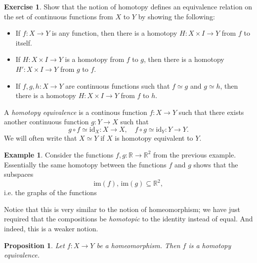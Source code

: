 \documentclass[10pt]{amsart}
\newtheorem{proposition}[thm]{Proposition}
\theoremstyle{definition}
\newtheorem{ex}[thm]{Example}
\newtheorem{exercise}[thm]{Exercise}
\newcommand{\cdef}[1]{\textcolor{Bittersweet}{#1}}
\begin{document}
\begin{exercise}
    Show that the notion of homotopy defines an equivalence relation on the set of continuous functions from $X$ to $Y$ by showing the following:
    \begin{itemize}
        \item If $f:X \to Y$ is any function, then there is a homotopy $H:X \times I \to Y$ from $f$ to itself.
        \item If $H:X \times I \to Y$ is a homotopy from $f$ to $g$, then there is a homotopy $H':X \times I \to Y$ from $g$ to $f$.
        \item If $f, g, h:X \to Y$ are continuous functions such that $f \simeq g$ and $g \simeq h$, then there is a homotopy $H:X \times I \to Y$ from $f$ to $h$.
    \end{itemize}
\end{exercise}

A \emph{\cdef{homotopy equivalence}} is a continous function $f: X \to Y$ such that there exists another continuous function $g :Y \to X$ such that
\[g \circ f \simeq \text{id}_X:X \to X, \quad f \circ g\simeq \text{id}_Y:Y \to Y.\]
We will often write that $X \simeq Y$ if $X$ is homotopy equivalent to $Y$.

\begin{ex}
    Consider the functions $f,g:\mathbb{R} \to \mathbb{R}^2$ from the previous example. Essentially the same homotopy between the functions $f$ and $g$ shows that the subspaces
    \[
    \text{im}(f), \,\text{im}(g) \subseteq \mathbb{R}^2,
    \]
    i.e. the graphs of the functions
\end{ex}

Notice that this is very similar to the notion of homeomorphism; we have just required that the compositions be \emph{homotopic} to the identity instead of equal. And indeed, this is a weaker notion.
\begin{proposition}
    Let $f:X \to Y$ be a homeomorphism. Then $f$ is a homotopy equivalence.
\end{proposition}
\end{document}
